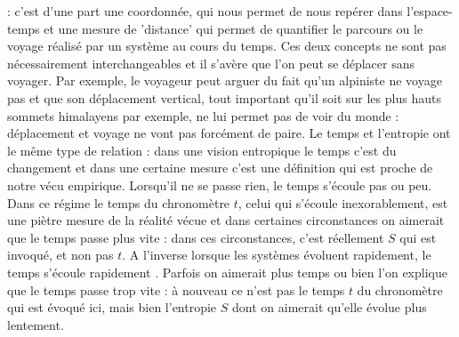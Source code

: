 : c'est d'une part une coordonnée, qui nous permet de nous repérer dans l'espace-temps et une mesure de 'distance' qui permet de quantifier le parcours ou le voyage réalisé par un système au cours du temps. Ces deux concepts ne sont pas nécessairement interchangeables et il s'avère que l'on peut se déplacer sans voyager. Par exemple, le voyageur peut arguer du fait qu'un alpiniste ne voyage pas et que son déplacement vertical, tout important qu'il soit sur les plus hauts sommets himalayens par exemple, ne lui permet pas de voir du monde : déplacement et voyage ne vont pas forcément de paire. Le temps et l'entropie ont le même type de relation : dans une vision entropique le temps c'est du changement et dans une certaine mesure c'est une définition qui est proche de notre vécu empirique. Lorsqu'il ne se passe rien, le temps s'écoule pas ou peu. Dans ce régime le temps du chronomètre $t$, celui qui s'écoule inexorablement, est une piètre mesure de la réalité vécue et dans certaines circonstances on aimerait que le temps passe plus vite : dans ces circonstances, c'est réellement $S$ qui est invoqué, et non pas $t$. A l'inverse lorsque les systèmes évoluent rapidement, le temps s'écoule rapidement . Parfois on aimerait plus temps ou bien l'on explique que le temps passe trop vite : à nouveau ce n'est pas le temps $t$ du chronomètre qui est évoqué ici, mais bien l'entropie $S$ dont on  aimerait qu'elle évolue plus lentement.

